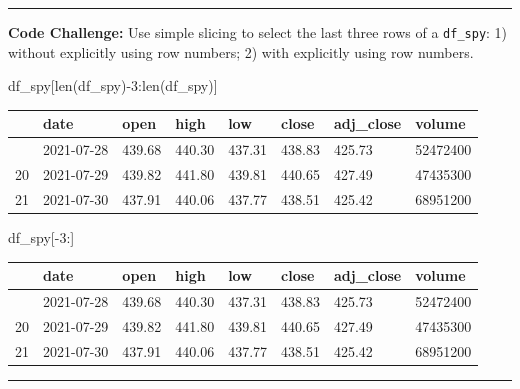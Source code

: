 \documentclass[
  letterpaper,
  DIV=11,
  numbers=noendperiod]{scrreprt}
\newenvironment{Shaded}{\begin{snugshade}}{\end{snugshade}}
\newcommand{\BuiltInTok}[1]{\textcolor[rgb]{0.00,0.23,0.31}{#1}}
\newcommand{\DecValTok}[1]{\textcolor[rgb]{0.68,0.00,0.00}{#1}}
\newcommand{\NormalTok}[1]{\textcolor[rgb]{0.00,0.23,0.31}{#1}}
\newcommand{\OperatorTok}[1]{\textcolor[rgb]{0.37,0.37,0.37}{#1}}
\begin{document}
\begin{center}\rule{0.5\linewidth}{0.5pt}\end{center}

\textbf{Code Challenge:} Use simple slicing to select the last three
rows of a \texttt{df\_spy}: 1) without explicitly using row numbers; 2)
with explicitly using row numbers.

\begin{Shaded}
\begin{Highlighting}[]
\NormalTok{df\_spy[}\BuiltInTok{len}\NormalTok{(df\_spy)}\OperatorTok{{-}}\DecValTok{3}\NormalTok{:}\BuiltInTok{len}\NormalTok{(df\_spy)]}
\end{Highlighting}
\end{Shaded}

\begin{longtable}[]{@{}llllllll@{}}
\toprule\noalign{}
& date & open & high & low & close & adj\_close & volume \\
\midrule\noalign{}
\endhead
\bottomrule\noalign{}
\endlastfoot
19 & 2021-07-28 & 439.68 & 440.30 & 437.31 & 438.83 & 425.73 &
52472400 \\
20 & 2021-07-29 & 439.82 & 441.80 & 439.81 & 440.65 & 427.49 &
47435300 \\
21 & 2021-07-30 & 437.91 & 440.06 & 437.77 & 438.51 & 425.42 &
68951200 \\
\end{longtable}

\begin{Shaded}
\begin{Highlighting}[]
\NormalTok{df\_spy[}\OperatorTok{{-}}\DecValTok{3}\NormalTok{:]}
\end{Highlighting}
\end{Shaded}

\begin{longtable}[]{@{}llllllll@{}}
\toprule\noalign{}
& date & open & high & low & close & adj\_close & volume \\
\midrule\noalign{}
\endhead
\bottomrule\noalign{}
\endlastfoot
19 & 2021-07-28 & 439.68 & 440.30 & 437.31 & 438.83 & 425.73 &
52472400 \\
20 & 2021-07-29 & 439.82 & 441.80 & 439.81 & 440.65 & 427.49 &
47435300 \\
21 & 2021-07-30 & 437.91 & 440.06 & 437.77 & 438.51 & 425.42 &
68951200 \\
\end{longtable}

\begin{center}\rule{0.5\linewidth}{0.5pt}\end{center}
\end{document}
